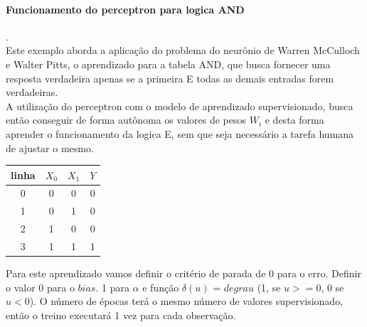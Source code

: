 \documentclass[	12pt, Times, openright, twoside, a4paper, english, brazil]{abntex2}
\begin{document}
        \paragraph*{Funcionamento do perceptron para logica AND}.\\
		 Este exemplo aborda a aplicação do problema do neurônio de Warren McCulloch e Walter Pitts, o aprendizado para a tabela AND, que busca fornecer uma resposta verdadeira apenas se a primeira E todas as demais entradas forem verdadeiras.\\            	
        A utilização do perceptron com o modelo de aprendizado supervisionado, busca então conseguir de forma autônoma os valores de pesos $W_i$ e desta forma aprender o funcionamento da logica E, sem que seja necessário a tarefa humana de ajustar o mesmo.\\
                 \begin{table}[!ht]
                 \centering
  				  \begin{tabular}{|c|c|c|c|}
  				 	\hline  \textbf{linha} & \textbf{$X_0$} & \textbf{$X_1$} &  \textbf{$Y$}\\
  				 	\hline 0 & 0 & 0 & 0\\
  				 	\hline 1 & 0 & 1 & 0\\
  				 	\hline 2 & 1 & 0 & 0\\
  				 	\hline 3 & 1 & 1 & 1\\
  				  \end{tabular}
                \end{table}
					
  Para este aprendizado vamos definir o critério de parada de 0 para o erro. 
  Definir o valor 0 para o $bias$. 
  1 para $\alpha$ e 
  função $\delta(u)$ = $degrau$ (1, se $u>=0$, 0 se $u<0$).
  O número de épocas terá o mesmo número de valores supervisionado, então o treino executará 1 vez para cada observação.
  			 	   
\end{document}

